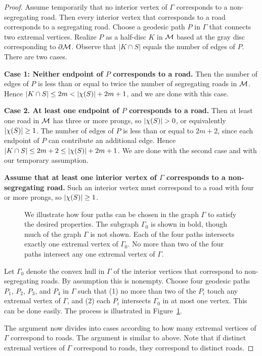 \begin{proof}
Assume temporarily that no interior vertex of $\Gamma$ corresponds to a non-segregating road.  Then every interior vertex that corresponds to a road corresponds to a segregating road.  Choose a geodesic path $P$ in $\Gamma$ that connects two extremal vertices.  Realize $P$ as a half-disc $K$ in $\mathcal{M}$ based at the gray disc corresponding to $\partial\mathcal{M}$.  Observe that $|K\cap S|$ equals the number of edges of $P$.  There are two cases.

\textbf{Case 1: Neither endpoint of $P$ corresponds to a road.}  Then the number of edges of $P$ is less than or equal to twice the number of segregating roads in $\mathcal{M}$.  Hence $|K\cap S|\leq 2m<\ec{S}+2m+1$, and we are done with this case. 

\textbf{Case 2. At least one endpoint of $P$ corresponds to a road.}  Then at least one road in $\mathcal{M}$ has three or more prongs, so $\ec{S}>0$, or equivalently $| \chi (S) |\geq 1$.  The number of edges of $P$ is less than or equal to $2m+2$, since each endpoint of $P$ can contribute an additional edge.   Hence $|K\cap S|\leq 2m+2\leq| \chi (S) |+2m+1$.  We are done with the second case and with our temporary assumption. 

\textbf{Assume that at least one interior vertex of $\Gamma$ corresponds to a non-segregating road.}  Such an interior vertex must correspond to a road with four or more prongs, so $| \chi (S) |\geq 1$.

\begin{figure}
\caption{
We illustrate how four paths can be chosen in the graph $\Gamma$ to satisfy the desired properties.  The subgraph $\Gamma_{0}$ is shown in bold, though much of the graph $\Gamma$ is not shown.  Each of the four paths intersects exactly one extremal vertex of $\Gamma_{0}$.  No more than two of the four paths intersect any one extremal vertex of $\Gamma$.
}
\label{four paths}
\end{figure}

Let $\Gamma_{0}$ denote the convex hull in $\Gamma$ of the interior vertices that correspond to non-segregating roads.  By assumption this is nonempty.  Choose four geodesic paths $P_{1}$, $P_{2}$, $P_{3}$, and $P_{4}$ in $\Gamma$ such that (1) no more than two of the $P_{i}$ touch any extremal vertex of $\Gamma$, and (2) each $P_{i}$ intersects $\Gamma_{0}$ in at most one vertex.  This can be done easily.  The process is illustrated in Figure~\ref{four paths}.

The argument now divides into cases according to how many extremal vertices of $\Gamma$ correspond to roads.  The argument is similar to above.  Note that if distinct extremal vertices of $\Gamma$ correspond to roads, they correspond to distinct roads.


\end{proof}
